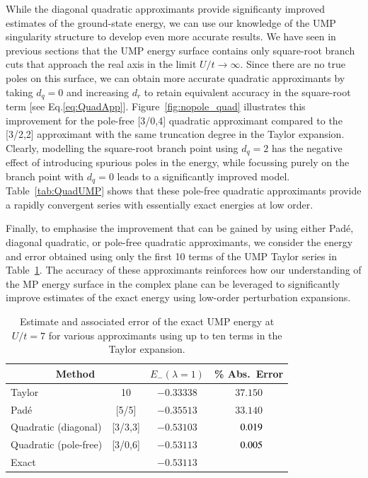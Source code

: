 \documentclass[aps,prb,reprint,noshowkeys,superscriptaddress]{revtex4-1}
\newcommand{\mc}{\multicolumn}
\begin{document}
While the diagonal quadratic approximants provide significanty improved estimates of the 
ground-state energy, we can use our knowledge of the UMP singularity structure to develop
even more accurate results.
We have seen in previous sections that the UMP energy surface
contains only square-root branch cuts that approach the real axis in the limit $U/t \to \infty$. 
Since there are no true poles on this surface, we can obtain more accurate quadratic approximants by
taking $d_q = 0$ and increasing $d_r$ to retain equivalent accuracy in the square-root term [see Eq.\eqref{eq:QuadApp}].
Figure~\ref{fig:nopole_quad} illustrates this improvement for the pole-free [3/0,4] quadratic
approximant compared to the [3/2,2] approximant with the same truncation degree in the Taylor
expansion.
Clearly, modelling the square-root branch point using $d_q = 2$ has the negative effect of
introducing spurious poles in the energy, while focussing purely on the branch point with $d_q = 0$
leads to a significantly improved model.
Table~\ref{tab:QuadUMP} shows that these pole-free quadratic approximants
provide a rapidly convergent series with essentially exact energies at low order.


Finally, to emphasise the improvement that can be gained by using either Pad\'e, diagonal quadratic,
or pole-free quadratic approximants, we consider the energy and error obtained using only the first 10 terms of the UMP
Taylor series in Table~\ref{tab:UMP_order10}.
The accuracy of these approximants reinforces how our understanding of the MP
energy surface in the complex plane can be leveraged to significantly improve estimates of the exact
energy using low-order perturbation expansions.

\begin{table}[h]
	\caption{
    Estimate and associated error of the exact UMP energy at $U/t = 7$ for 
    various approximants using up to ten terms in the Taylor expansion.
	\label{tab:UMP_order10}}
	\begin{ruledtabular}
		\begin{tabular}{lccc}
            \mc{2}{c}{Method}	 &	$E_{-}(\lambda = 1)$ & \% Abs.\ Error \\ 
			\hline
            Taylor		         &	 10	         &	$-0.33338$      &  $37.150$ \\
            Pad\'e               &   [5/5]       &  $-0.35513$      &  $33.140$ \\
            Quadratic (diagonal) &   [3/3,3]     &  $-0.53103$      &  $\hphantom{0}0.019$ \\
            Quadratic (pole-free)&   [3/0,6]     &  $-0.53113$      &  $\hphantom{0}0.005$ \\
			\hline
            Exact		         &	        	 &	$-0.53113$	     &            \\
		\end{tabular}
	\end{ruledtabular}
\end{table}
\end{document}
